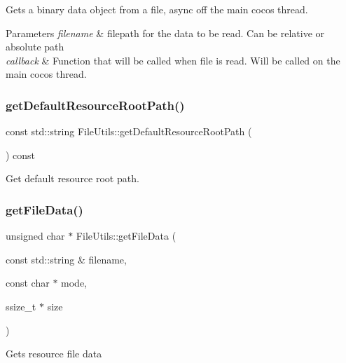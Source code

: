Gets a binary data object from a file, async off the main cocos thread.


\begin{DoxyParams}{Parameters}
{\em filename} & filepath for the data to be read. Can be relative or absolute path \\
\hline
{\em callback} & Function that will be called when file is read. Will be called on the main cocos thread. \\
\hline
\end{DoxyParams}
\mbox{\label{classFileUtils_ad7be12b938a4aab370beef6dcb553a1d}} 
\subsubsection{\texorpdfstring{get\+Default\+Resource\+Root\+Path()}{getDefaultResourceRootPath()}}
{\footnotesize\ttfamily const std\+::string File\+Utils\+::get\+Default\+Resource\+Root\+Path (\begin{DoxyParamCaption}{ }\end{DoxyParamCaption}) const}

Get default resource root path. \mbox{\label{classFileUtils_ae261ba024555431d4ecc746ace25fdfe}} 
\subsubsection{\texorpdfstring{get\+File\+Data()}{getFileData()}\hspace{0.1cm}{\footnotesize\ttfamily [1/2]}}
{\footnotesize\ttfamily unsigned char $\ast$ File\+Utils\+::get\+File\+Data (\begin{DoxyParamCaption}\item[{const std\+::string \&}]{filename,  }\item[{const char $\ast$}]{mode,  }\item[{ssize\+\_\+t $\ast$}]{size }\end{DoxyParamCaption})\hspace{0.3cm}{\ttfamily [virtual]}}

Gets resource file data



